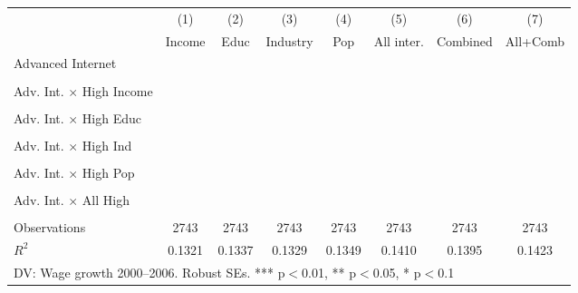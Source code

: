 \begin{adjustbox}{max width=\textwidth}
\begin{tabular}{lccccccc}
\toprule
 & (1) & (2) & (3) & (4) & (5) & (6) & (7) \\
 & Income & Educ & Industry & Pop & All inter. & Combined & All+Comb \\
\midrule
Advanced Internet &  &  &  &  &  &  &  \\
 &  &  &  &  &  &  &  \\[0.3em]
Adv. Int. $\times$ High Income &  &  &  &  &  &  &  \\
 &  &  &  &  &  &  &  \\[0.3em]
Adv. Int. $\times$ High Educ &  &  &  &  &  &  &  \\
 &  &  &  &  &  &  &  \\[0.3em]
Adv. Int. $\times$ High Ind &  &  &  &  &  &  &  \\
 &  &  &  &  &  &  &  \\[0.3em]
Adv. Int. $\times$ High Pop &  &  &  &  &  &  &  \\
 &  &  &  &  &  &  &  \\[0.3em]
Adv. Int. $\times$ All High &  &  &  &  &  &  &  \\
 &  &  &  &  &  &  &  \\[0.3em]
\midrule
Observations & 2743 & 2743 & 2743 & 2743 & 2743 & 2743 & 2743 \\
$R^2$ & 0.1321 & 0.1337 & 0.1329 & 0.1349 & 0.1410 & 0.1395 & 0.1423 \\
\bottomrule
\multicolumn{8}{l}{\footnotesize DV: Wage growth 2000--2006. Robust SEs. *** p$<$0.01, ** p$<$0.05, * p$<$0.1} \\
\end{tabular}
\end{adjustbox}
